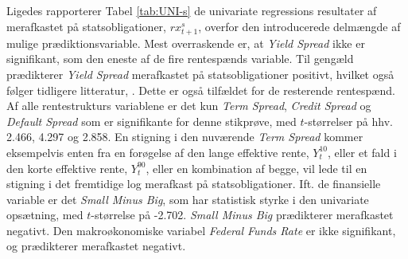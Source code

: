 \documentclass[
  a4paper,
  oneside]{memoir}
\begin{document}
Ligedes rapporterer Tabel \ref{tab:UNI-s} de univariate regressions resultater af merafkastet på statsobligationer, \(rx_{t+1}^s\), overfor den introducerede delmængde af mulige prædiktionsvariable. Mest overraskende er, at \emph{Yield Spread} ikke er signifikant, som den eneste af de fire rentespænds variable. Til gengæld prædikterer \emph{Yield Spread} merafkastet på statsobligationer positivt, hvilket også følger tidligere litteratur, \citep{Fama1987}. Dette er også tilfældet for de resterende rentespænd. Af alle rentestrukturs variablene er det kun \emph{Term Spread}, \emph{Credit Spread} og \emph{Default Spread} som er signifikante for denne stikprøve, med \(t\)-størrelser på hhv. 2.466, 4.297 og 2.858. En stigning i den nuværende \emph{Term Spread} kommer eksempelvis enten fra en forøgelse af den lange effektive rente, \(Y_t^{10}\), eller et fald i den korte effektive rente, \(Y_t^{90}\), eller en kombination af begge, vil lede til en stigning i det fremtidige log merafkast på statsobligationer. Ift. de finansielle variable er det \emph{Small Minus Big}, som har statistisk styrke i den univariate opsætning, med \(t\)-størrelse på -2.702. \emph{Small Minus Big} prædikterer merafkastet negativt. Den makroøkonomiske variabel \emph{Federal Funds Rate} er ikke signifikant, og prædikterer merafkastet negativt.
\end{document}
